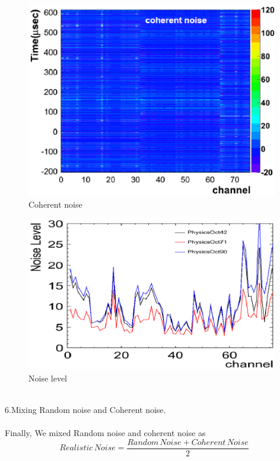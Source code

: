 \begin{figure}[!htb]
  \centering
  \centering
  \includegraphics[width=11cm,clip]{./fig/coherentNoise.eps}
  \caption{Coherent noise}
  \label{coherentNoise}
\end{figure}
\begin{figure}[!htb]
  \centering
  \centering
  \includegraphics[width=11cm,clip]{./fig/scaling.eps}
  \caption{Noise level}
  \label{scaling}
\end{figure}
\\
6.Mixing Random noise and Coherent noise.\\
\\
Finally, We mixed Random noise and coherent noise as \\
\begin{equation}
  Realistic\,Noise = \frac{Random\,Noise + Coherent\,Noise}{2}
\end{equation}
